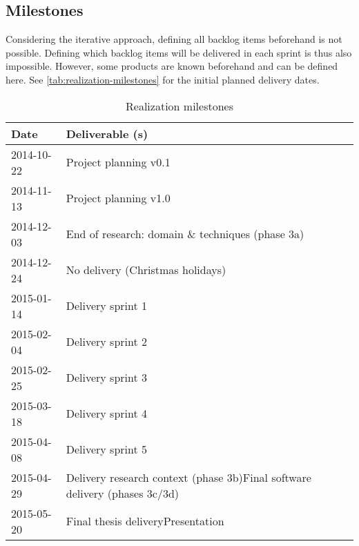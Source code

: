 \subsection{Milestones}
Considering the iterative approach, defining all backlog items beforehand is not possible.
Defining which backlog items will be delivered in each sprint is thus also impossible.
However, some products are known beforehand and can be defined here.
See \autoref{tab:realization-milestones} for the initial planned delivery dates.
%
\begin{table}[h]
  \begin{tabular}{|l|l|}\hline
    \textbf{Date} & \textbf{Deliverable (s)} \\\hline
    2014-10-22 & Project planning v0.1 \\\hline
    2014-11-13 & Project planning v1.0 \\\hline
    2014-12-03 & End of research: domain \& techniques (phase 3a) \\\hline
    2014-12-24 & No delivery (Christmas holidays) \\\hline
    2015-01-14 & Delivery sprint 1\\\hline
    2015-02-04 & Delivery sprint 2\\\hline
    2015-02-25 & Delivery sprint 3\\\hline
    2015-03-18 & Delivery sprint 4\\\hline
    2015-04-08 & Delivery sprint 5\\\hline
    2015-04-29 & Delivery research context (phase 3b)\newline{}Final software delivery (phases 3c/3d)\\\hline
    2015-05-20 & Final thesis delivery\newline{}Presentation\\\hline
  \end{tabular}
  \caption{Realization milestones}
  \label{tab:realization-milestones}
\end{table}
